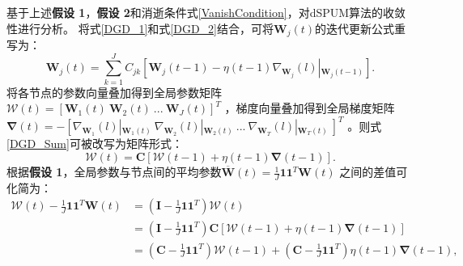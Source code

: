 基于上述\textbf{假设 1}，\textbf{假设 2}和消逝条件式\eqref{VanishCondition}，对dSPUM算法的收敛性进行分析。
将式\eqref{DGD_1}和式\eqref{DGD_2}结合，可将$\boldsymbol W_j\left(t\right)$的迭代更新公式重写为：
\begin{equation}
    \label{DGD_Sum}
    \boldsymbol W_j\left(t\right)=\sum_{k=1}^{J}C_{jk} \left[
    \boldsymbol W_j\left(t-1\right)-\eta\left(t-1\right)\nabla_{\boldsymbol W_j}\left(l\right)\left|_{\boldsymbol W_j\left(t-1\right)}\right. \right].
\end{equation}
{将各节点的参数向量叠加得到全局参数矩阵$\boldsymbol{\mathcal{W}}\left(t\right)=\left[\boldsymbol W_1\left(t\right)~\boldsymbol W_2\left(t\right)~...~\boldsymbol W_J\left(t\right)\right]^T$
，梯度向量叠加得到全局梯度矩阵$\boldsymbol{\nabla}\left(t\right)=-\left[\nabla_{\boldsymbol W_1}\left(l\right)\left|_{\boldsymbol W_1\left(t\right)}\right.~\nabla_{\boldsymbol W_2}\left(l\right)\left|_{\boldsymbol W_2\left(t\right)}\right.~...~\nabla_{\boldsymbol W_T}\left(l\right)\left|_{\boldsymbol W_T\left(t\right)}\right.~\right]^T$
。}则式\eqref{DGD_Sum}可被改写为矩阵形式：
\begin{equation}
    \label{DGD_Sum_M}
    \boldsymbol{\mathcal{W}}\left(t\right)=\boldsymbol C \left[
    \boldsymbol{\mathcal{W}}\left(t-1\right)+\eta\left(t-1\right)\boldsymbol{\nabla}\left(t-1\right)
    \right].
\end{equation}
根据\textbf{假设 1}，全局参数与节点间的平均参数$\overline{\boldsymbol W}\left(t\right)=\frac{1}{J}\boldsymbol1\boldsymbol1^T\boldsymbol W\left(t\right)$
之间的差值可化简为：
\begin{equation}
    \label{DisOfWW}
    \begin{split}
        \boldsymbol{\mathcal{W}}\left(t\right) - \frac{1}{J}\boldsymbol1\boldsymbol1^T\boldsymbol W\left(t\right)
        &=\left(\boldsymbol I-\frac{1}{J}\boldsymbol1\boldsymbol1^T\right)\boldsymbol{\mathcal{W}}\left(t\right) \\
        &=\left(\boldsymbol I-\frac{1}{J}\boldsymbol1\boldsymbol1^T\right)\boldsymbol C\left[
            \boldsymbol{\mathcal{W}}\left(t-1\right)+\eta\left(t-1\right)\boldsymbol{\nabla}\left(t-1\right)
        \right] \\
        &=\left(\boldsymbol C-\frac{1}{J}\boldsymbol1\boldsymbol1^T\right)\boldsymbol{\mathcal{W}}\left(t-1\right)
        +\left(\boldsymbol C-\frac{1}{J}\boldsymbol1\boldsymbol1^T\right)\eta\left(t-1\right)\boldsymbol{\nabla}\left(t-1\right),
    \end{split}
\end{equation}
